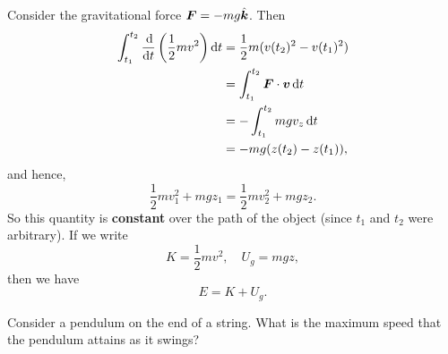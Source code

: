 \documentclass[../classical_mechanics.tex]{subfiles}
\begin{document}
        Consider the gravitational force $\boldsymbol{F}=-mg\hat{\boldsymbol{k}}$. Then
        \begin{align}
            \int_{t_1}^{t_2}\dv{}{t}\left(\frac{1}{2}mv^2\right)\dd{t}&=\frac{1}{2}m(v(t_2)^2-v(t_1)^2)\\
            &=\int_{t_1}^{t_2}\vec{F}\cdot\vec{v}\dd{t}\\
            &=-\int_{t_1}^{t_2}mgv_z\dd{t}\\
            &=-mg(z(t_2)-z(t_1)),
        \end{align}
        and hence,
        \begin{equation}
            \frac{1}{2}mv_1^2+mgz_1=\frac{1}{2}mv_2^2+mgz_2.
        \end{equation}
        So this quantity is \textbf{constant} over the path of the object (since $t_1$ and $t_2$ were arbitrary).
        If we write
        \begin{equation}
            K=\frac{1}{2}mv^2,\quad U_g=mgz,
        \end{equation}
        then we have
        \begin{equation}
            E=K+U_g.
        \end{equation}
        \begin{example}
            Consider a pendulum on the end of a string. What is the maximum speed that the pendulum attains as it swings?
        \end{example}
\end{document}
